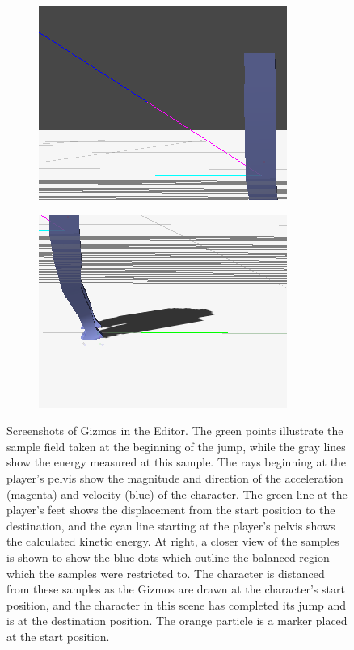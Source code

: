 \begin{figure}[ht]
	\begin{subfigure}[b]{0.49\textwidth}
		\includegraphics[width=\textwidth]{images/gizmos3.png}
	\end{subfigure}
	\begin{subfigure}[b]{0.49\textwidth}
		\includegraphics[width=\textwidth]{images/gizmos4.png}
	\end{subfigure}
	\caption[Screenshot of Gizmos used for debug visualizations in \unity{}]{Screenshots of Gizmos in the \unity{} Editor.  The green points illustrate the sample field taken at the beginning of the jump, while the gray lines show the energy measured at this sample.  The rays beginning at the player's pelvis show the magnitude and direction of the acceleration (magenta) and velocity (blue) of the character.  The green line at the player's feet shows the displacement from the start position to the destination, and the cyan line starting at the player's pelvis shows the calculated kinetic energy.  At right, a closer view of the samples is shown to show the blue dots which outline the balanced region which the samples were restricted to.  The character is distanced from these samples as the Gizmos are drawn at the character's start position, and the character in this scene has completed its jump and is at the destination position.  The orange particle is a marker placed at the start position.}

\end{figure}
